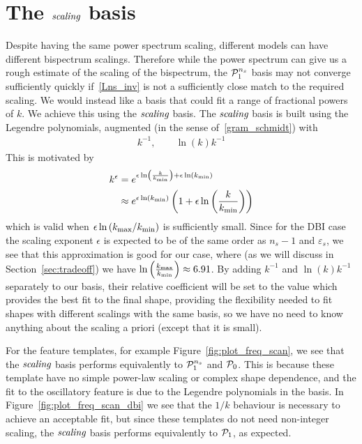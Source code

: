 \section{The $\textit{scaling}$ basis}\label{sec:scaling_definition}
    Despite having the same power spectrum scaling,
    different models can have different bispectrum scalings.
    Therefore while the power spectrum can give us a
    rough estimate of the scaling of the bispectrum,
    the $\mathcal{P}^{n_s}_1$ basis may not converge sufficiently quickly if~\eqref{Lns_inv}
    is not a sufficiently close match to the required scaling.
    We would instead like a basis that could fit
    a range of fractional powers of $k$.
    We achieve this using the $\textit{scaling}$ basis.
    The $\textit{scaling}$ basis is built using the Legendre polynomials,
    augmented (in the sense of~\eqref{gram_schmidt})
    with
    \begin{align}\label{scaling_basis_definition}
        k^{-1},\qquad \ln(k)k^{-1}
    \end{align}
    This is motivated by
    \begin{align}
        k^\epsilon &= e^{\epsilon\ln\left(\frac{k}{{k_\text{min}}}\right)+\epsilon\ln({k_\text{min}})}\\
                   &\approx e^{\epsilon\ln\left({k_\text{min}}\right)}
                      \left(1+\epsilon\ln\left(\frac{k}{{k_\text{min}}}\right)\right)
    \end{align}
    which is valid when $\epsilon\ln\left({k_\text{max}}/{k_\text{min}}\right)$ is
    sufficiently small.
    Since for the DBI case the scaling exponent $\epsilon$ is expected to be of the
    same order as $n_s-1$ and $\varepsilon_s$, we see that this
    approximation is good for our case,
    where (as we will discuss in Section~\ref{sec:tradeoff})
    we have $\ln\left(\frac{{k_\text{max}}}{{k_\text{min}}}\right)\approx6.91$.
    By adding $k^{-1}$ and $\ln(k)k^{-1}$ separately to our
    basis, their relative coefficient will be set to the value
    which provides the best fit to the final shape,
    providing the flexibility needed to fit shapes with different
    scalings with the same basis, so we have no need to know anything
    about the scaling a priori (except that it is small).


    For the feature templates, for example Figure~\ref{fig:plot_freq_scan},
    we see that the $\textit{scaling}$ basis performs equivalently to $\mathcal{P}^{n_s}_1$
    and $\mathcal{P}_0$.
    This is because these template have no simple power-law scaling or complex shape dependence,
    and the fit to the oscillatory feature is due to the Legendre polynomials
    in the basis.
    In Figure~\ref{fig:plot_freq_scan_dbi} we see that the $1/k$ behaviour is
    necessary to achieve an acceptable fit, but since these templates
    do not need non-integer scaling, the $\textit{scaling}$ basis performs
    equivalently to $\mathcal{P}_1$, as expected.



